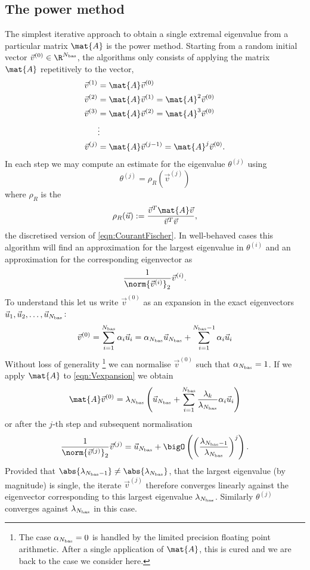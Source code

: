\subsection{The power method}
\label{sec:Power}
The simplest iterative approach to obtain a single extremal eigenvalue
from a particular matrix $\mat{A}$ is the power method.
Starting from a random initial vector $\vec{v}^{(0)} \in \R^{\Nbas}$,
the algorithms only consists of applying the matrix $\mat{A}$
repetitively to the vector, \ie
\begin{align*}
	\vec{v}^{(1)} &= \mat{A} \vec{v}^{(0)} \\
	\vec{v}^{(2)} &= \mat{A} \vec{v}^{(1)} = \mat{A}^2 \vec{v}^{(0)} \\
	\vec{v}^{(3)} &= \mat{A} \vec{v}^{(2)} = \mat{A}^3 \vec{v}^{(0)} \\
	&\vdots \\
	\vec{v}^{(j)} &= \mat{A} \vec{v}^{(j-1)} = \mat{A}^j \vec{v}^{(0)}.
\end{align*}
In each step we may compute an estimate for the eigenvalue $\theta^{(j)}$ using
\begin{equation}
	\theta^{(j)} = \rho_R\left(\vec{v}^{(j)}\right)
	\label{eqn:RitzValue}
\end{equation}
where $\rho_R$ is the
\begin{equation}
	 \rho_R(\vec{u}) := \frac{\vec{v}^T \mat{A} \vec{v}}{\vec{v}^T \vec{v}},
	\label{eqn:RayleighQuotient}
\end{equation}
the discretised version of \eqref{eqn:CourantFischer}.
In well-behaved cases this algorithm will find an approximation for
the largest eigenvalue in $\theta^{(i)}$
and an approximation for the corresponding eigenvector as
\[ \frac{1}{\norm{\vec{v}^{(i)}}_2}  \vec{v}^{(i)}. \]
To understand this
let us write $\vec{v}^{(0)}$ as an expansion in the exact
eigenvectors \linebreak $\vec{u}_1, \vec{u}_2, \ldots, \vec{u}_{N_\text{bas}}$:
\begin{equation}
	\vec{v}^{(0)} = \sum_{i=1}^{N_\text{bas}} \alpha_i \vec{u}_i = \alpha_{N_\text{bas}} \vec{u}_{N_\text{bas}} + \sum_{i=1}^{N_\text{bas}-1} \alpha_i \vec{u}_i
	\label{eqn:Vexpansion}
\end{equation}
Without loss of generality%
\footnote{The case $\alpha_{N_\text{bas}} = 0$ is handled by the limited precision
floating point arithmetic. After a single application of $\mat{A}$,
this is cured and we are back to the case we consider here.}
we can normalise $\vec{v}^{(0)}$ such that $\alpha_{N_\text{bas}} = 1$.
If we apply $\mat{A}$ to \eqref{eqn:Vexpansion} we obtain
\[
	\mat{A} \vec{v}^{(0)} = \lambda_{\Nbas} \left( \vec{u}_{\Nbas} + \sum_{i=1}^{\Nbas}
	\frac{\lambda_k}{\lambda_{\Nbas}}
	\alpha_i \vec{u}_i \right)
\]
or after the $j$-th step and subsequent normalisation
\[
	\frac{1}{\norm{\vec{v}^{(j)}}_2} \vec{v}^{(j)} =
	\vec{u}_{\Nbas} + \bigO\left(
	\left( \frac{\lambda_{\Nbas-1}}{\lambda_{\Nbas}} \right)^j
	\right).
\]
Provided that $\abs{\lambda_{\Nbas-1}} \neq \abs{\lambda_{\Nbas}}$,
\ie that the largest eigenvalue (by magnitude) is single,
the iterate $\vec{v}^{(j)}$
therefore converges linearly against the eigenvector corresponding to this
largest eigenvalue $\lambda_{N_\text{bas}}$.
Similarly $\theta^{(j)}$ converges against $\lambda_{N_\text{bas}}$ in this case.

